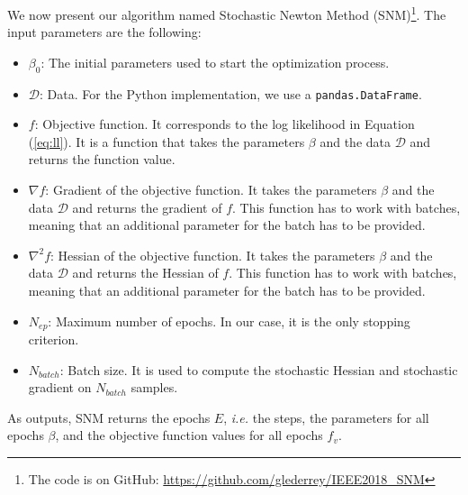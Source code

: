 \documentclass[conference]{IEEEtran}
\begin{document}
We now present our algorithm named Stochastic Newton Method (SNM)\footnote{The code is on GitHub: \href{https://github.com/glederrey/IEEE2018\_SNM}{https://github.com/glederrey/IEEE2018\_SNM}}. The input parameters are the following:
\begin{itemize}
\item $\beta_0$: The initial parameters used to start the optimization process.
\item $\mathcal{D}$: Data. For the Python implementation, we use a \texttt{pandas.DataFrame}.
\item $f$: Objective function. It corresponds to the log likelihood in Equation (\ref{eq:ll}). It is a function that takes the parameters $\beta$ and the data $\mathcal{D}$ and returns the function value.
\item $\nabla f$: Gradient of the objective function. It takes the parameters $\beta$ and the data $\mathcal{D}$ and returns the gradient of $f$. This function has to work with batches, meaning that an additional parameter for the batch has to be provided.
\item $\nabla^2 f$: Hessian of the objective function. It takes the parameters $\beta$ and the data $\mathcal{D}$ and returns the Hessian of $f$. This function has to work with batches, meaning that an additional parameter for the batch has to be provided.
\item $N_{ep}$: Maximum number of epochs. In our case, it is the only stopping criterion.
\item $N_{batch}$: Batch size. It is used to compute the stochastic Hessian and stochastic gradient on $N_{batch}$ samples.
\end{itemize}
As outputs, SNM returns the epochs $E$, {\it i.e.} the steps, the parameters for all epochs $\beta$, and the objective function values for all epochs $f_v$. 
\end{document}
